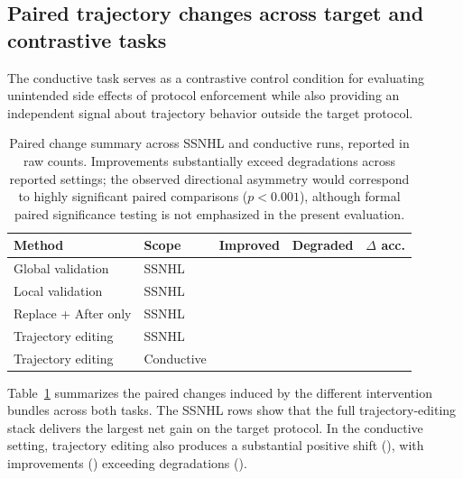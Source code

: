 \documentclass[twocolumn]{article}
\begin{document}
\subsection{Paired trajectory changes across target and contrastive tasks}

The conductive task serves as a contrastive control condition for evaluating
unintended side effects of protocol enforcement while also providing an
independent signal about trajectory behavior outside the target protocol.

\begin{table}[!htbp]
  \centering
  \small
  \begin{tabular}{llccc}
    \toprule
    Method & Scope & Improved & Degraded & $\Delta$ acc. \\
    \midrule
    Global validation & SSNHL & \SSNHLGlobalValidationImprovedCount{} &
    \SSNHLGlobalValidationDegradedCount{} & \SSNHLGlobalValidationDeltaPP{} \\
    Local validation & SSNHL & \SSNHLLocalValidationImprovedCount{} &
    \SSNHLLocalValidationDegradedCount{} & \SSNHLLocalValidationDeltaPP{} \\
    Replace + After only & SSNHL & \SSNHLReplaceAfterImprovedCount{} &
    \SSNHLReplaceAfterDegradedCount{} & \SSNHLReplaceAfterDeltaPP{} \\
    Trajectory editing & SSNHL & \SSNHLTrajectoryImprovedCount{} &
    \SSNHLTrajectoryDegradedCount{} & \SSNHLTrajectoryDeltaPP{} \\
    Trajectory editing & Conductive & \ConductiveTrajectoryImprovedCount{} &
    \ConductiveTrajectoryDegradedCount{} & \ConductiveTrajectoryDeltaPP{} \\
    \bottomrule
  \end{tabular}
  \caption{Paired change summary across SSNHL and conductive runs, reported in
raw counts. Improvements substantially exceed degradations across reported
settings; the observed directional asymmetry would correspond to highly
significant paired comparisons ($p < 0.001$), although formal paired
significance testing is not emphasized in the present
evaluation.}\label{tab:paired-trajectory-changes}
\end{table}

Table~\ref{tab:paired-trajectory-changes} summarizes the paired changes induced
by the different intervention bundles across both tasks. The SSNHL rows show
that the full trajectory-editing stack delivers the largest net gain on the
target protocol. In the conductive setting, trajectory editing also produces a
substantial positive shift (\ConductiveTrajectoryDeltaPP{}), with improvements
(\ConductiveTrajectoryImprovedPP{}) exceeding degradations
(\ConductiveTrajectoryDegradedPP{}).
\end{document}
